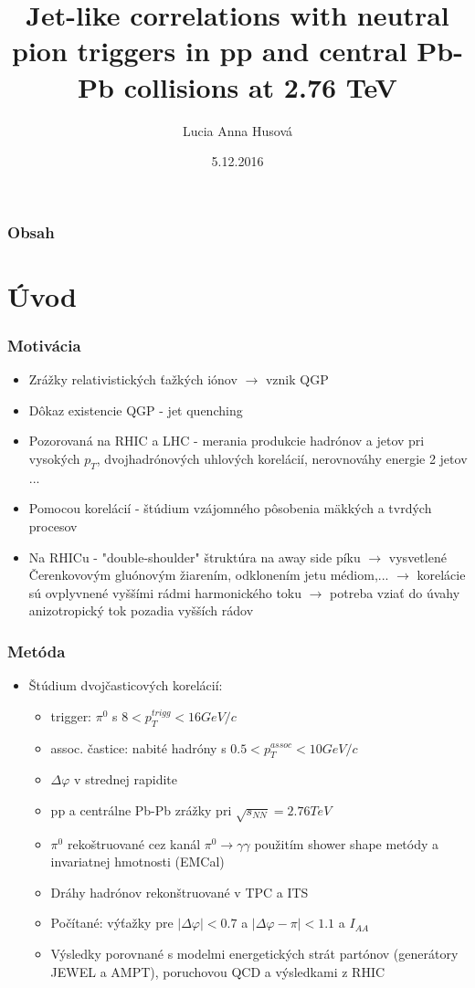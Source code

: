 \documentclass{beamer}
\title[]{Jet-like correlations with neutral pion triggers in pp and central Pb-Pb collisions at 2.76 TeV}
\author{Lucia Anna Husová}
\institute[UPJŠ] 
{
	Prírodovedecká fakulta\\
	Univerzita Pavla Jozefa Šafárika \\ 
	
	
}
\date{5.12.2016}
\begin{document}
	
	\begin{frame}
		\titlepage
	\end{frame}
	
	\begin{frame}
	\frametitle{Obsah}
		\tableofcontents 
	\end{frame}
	
	\section{Úvod}
	\begin{frame}
		\frametitle{Motivácia}
		\begin{itemize}
			\item Zrážky relativistických ťažkých iónov $\rightarrow$ vznik QGP 
			\item Dôkaz existencie QGP - jet quenching
			\item Pozorovaná na RHIC a LHC - merania produkcie hadrónov a jetov pri vysokých $p_T$, dvojhadrónových uhlových korelácií, nerovnováhy energie 2 jetov ...
			\item Pomocou korelácií - štúdium vzájomného pôsobenia mäkkých a tvrdých procesov
			\item Na RHICu - "double-shoulder" štruktúra na away side píku $\rightarrow$ vysvetlené Čerenkovovým gluónovým žiarením, odklonením jetu médiom,... $\rightarrow$ 
			korelácie sú ovplyvnené vyššími rádmi harmonického toku $\rightarrow$ potreba vziať do úvahy anizotropický tok pozadia vyšších rádov
		\end{itemize}
	\end{frame}
	
	\begin{frame}
		\frametitle{Metóda}
		\begin{itemize}
			\item Štúdium dvojčasticových korelácií:
			\begin{itemize}
				\item trigger: $\pi^{0}$ s $8<p_T^{trigg}<16GeV/c$
				\item assoc. častice: nabité hadróny s $0.5<p_T^{assoc}<10GeV/c$
				\item $\Delta\varphi$ v strednej rapidite 
				\item pp a centrálne Pb-Pb zrážky pri $\sqrt{s_{NN}}=2.76TeV$
				\item $\pi^{0}$ rekoštruované cez kanál $\pi^{0} \rightarrow \gamma \gamma$ použitím shower shape metódy a invariatnej hmotnosti (EMCal)
				\item Dráhy hadrónov rekonštruované v TPC a ITS
				\item Počítané: výťažky pre $\lvert\Delta \varphi\rvert < 0.7$ a $\lvert\Delta \varphi - \pi\rvert < 1.1$ a $I_{AA}$
				\item Výsledky porovnané s modelmi energetických strát partónov (generátory JEWEL a AMPT), poruchovou QCD a výsledkami z RHIC
			\end{itemize}
		\end{itemize}
	\end{frame}
	
\end{document}

